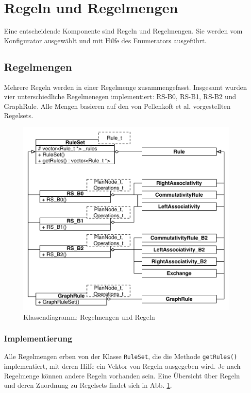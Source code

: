 \section{Regeln und Regelmengen}
Eine entscheidende Komponente sind Regeln und Regelmengen. Sie werden vom Konfigurator ausgewählt und mit Hilfe des Enumerators ausgeführt.

\subsection{Regelmengen}
Mehrere Regeln werden in einer Regelmenge zusammengefasst.
Insgesamt wurden vier unterschiedliche Regelmenegen implementiert: RS-B0, RS-B1, RS-B2 und GraphRule.
Alle Mengen basieren auf den von Pellenkoft et al. vorgestellten Regelsets.

\begin{figure}[ht]
  \centering
  \includegraphics[width=\textwidth]{04_Implementierung/RuleSets.pdf}
  \caption{Klassendiagramm: Regelmengen und Regeln}
  \label{RuleSetClass}
\end{figure}

\subsubsection{Implementierung}
\label{sec:RuleImplementation}

Alle Regelmengen erben von der Klasse \texttt{RuleSet}, die die Methode \texttt{getRules()} implementiert, mit deren Hilfe ein Vektor von Regeln ausgegeben wird. Je nach Regelmenge können andere Regeln vorhanden sein. Eine Übersicht über Regeln und deren Zuordnung zu Regelsets findet sich in Abb. \ref{RuleSetClass}.

